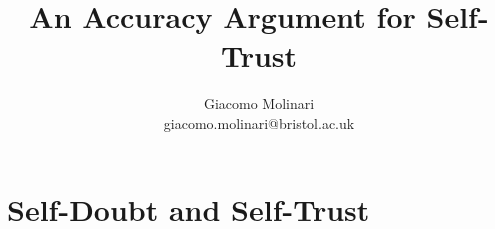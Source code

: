 \documentclass[aspectratio=169, dvipsnames]{beamer}
\title{An Accuracy Argument for Self-Trust}
\author{Giacomo Molinari\\giacomo.molinari@bristol.ac.uk}
\institute{University of Bristol}
\begin{document}
\maketitle


\section{Self-Doubt and Self-Trust}

\end{document}
